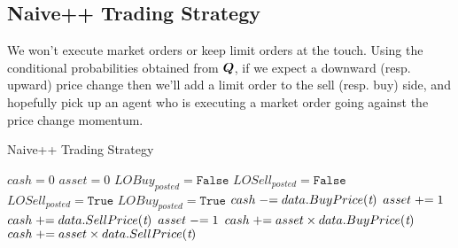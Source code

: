 \subsection{Naive++ Trading Strategy} We won't execute market orders or keep limit orders at the touch. Using the conditional probabilities obtained from $\boldsymbol{Q}$, if we expect a downward (resp. upward) price change then we'll add a limit order to the sell (resp. buy) side, and hopefully pick up an agent who is executing a market order going against the price change momentum. 
\begin{algorithm}[H]
\caption{Naive++ Trading Strategy}
\begin{algorithmic}[1]
\State $cash = 0$
\State $asset = 0$
	\State $LOBuy_{posted} = \texttt{False}$
	\State $LOSell_{posted} = \texttt{False}$
		\State $LOSell_{posted} = \texttt{True}$
		\State $LOBuy_{posted} = \texttt{True}$
	\EndIf
			\State $cash \mathrel{-}= data.BuyPrice(\textit{t})$	
			\State $asset \mathrel{+}= 1$
			\State $cash \mathrel{+}= data.SellPrice(\textit{t})$
			\State $asset \mathrel{-}= 1$
		\EndIf
	\EndFor
\EndFor
{} 
\State $cash \mathrel{+}= asset \times data.BuyPrice(\textit{t})$
\State $cash \mathrel{+}= asset \times data.SellPrice(\textit{t})$	
\EndIf
\end{algorithmic}
\end{algorithm}